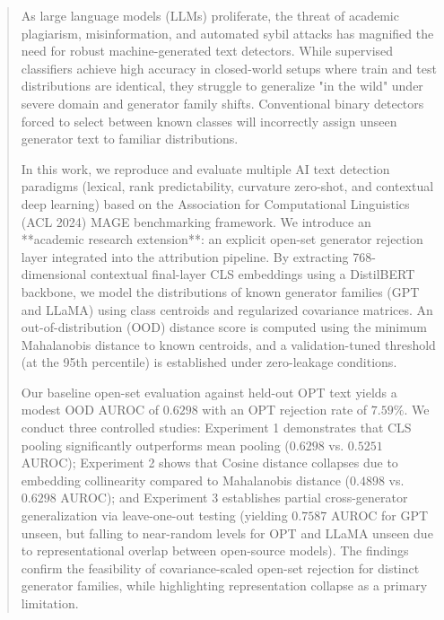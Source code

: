 \documentclass[12pt,a4paper]{report}
\begin{document}
\begin{abstract}
As large language models (LLMs) proliferate, the threat of academic plagiarism, misinformation, and automated sybil attacks has magnified the need for robust machine-generated text detectors. While supervised classifiers achieve high accuracy in closed-world setups where train and test distributions are identical, they struggle to generalize "in the wild" under severe domain and generator family shifts. Conventional binary detectors forced to select between known classes will incorrectly assign unseen generator text to familiar distributions.

In this work, we reproduce and evaluate multiple AI text detection paradigms (lexical, rank predictability, curvature zero-shot, and contextual deep learning) based on the Association for Computational Linguistics (ACL 2024) MAGE benchmarking framework. We introduce an **academic research extension**: an explicit open-set generator rejection layer integrated into the attribution pipeline. By extracting 768-dimensional contextual final-layer CLS embeddings using a DistilBERT backbone, we model the distributions of known generator families (GPT and LLaMA) using class centroids and regularized covariance matrices. An out-of-distribution (OOD) distance score is computed using the minimum Mahalanobis distance to known centroids, and a validation-tuned threshold (at the 95th percentile) is established under zero-leakage conditions.

Our baseline open-set evaluation against held-out OPT text yields a modest OOD AUROC of $0.6298$ with an OPT rejection rate of $7.59\%$. We conduct three controlled studies: Experiment 1 demonstrates that CLS pooling significantly outperforms mean pooling ($0.6298$ vs. $0.5251$ AUROC); Experiment 2 shows that Cosine distance collapses due to embedding collinearity compared to Mahalanobis distance ($0.4898$ vs. $0.6298$ AUROC); and Experiment 3 establishes partial cross-generator generalization via leave-one-out testing (yielding $0.7587$ AUROC for GPT unseen, but falling to near-random levels for OPT and LLaMA unseen due to representational overlap between open-source models). The findings confirm the feasibility of covariance-scaled open-set rejection for distinct generator families, while highlighting representation collapse as a primary limitation.
\end{abstract}

\newpage
\tableofcontents
\listoffigures
\listoftables
\newpage
\end{document}
